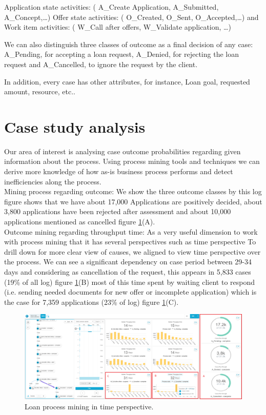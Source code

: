 Application state activities: ( A\_Create Application, A\_Submitted, A\_Concept,…)
Offer state activities: ( O\_Created, O\_Sent, O\_Accepted,…) and
Work item activities: ( W\_Call after offers, W\_Validate application, …)

We can also distinguish three classes of outcome as a final decision of any case:
A\_Pending, for accepting a loan request,
A\_Denied, for rejecting the loan request and
A\_Cancelled, to ignore the request by the client.

In addition, every case has other attributes, for instance, Loan goal, requested amount, resource, etc.. 


\section{Case study analysis}
Our area of interest is analysing case outcome probabilities regarding given information about the process. Using process mining tools and techniques we can derive more knowledge of how as-is business process performs and detect inefficiencies along the process. 
\\

Mining process regarding outcome: 
We show the three outcome classes by this log figure shows that we have about 17,000
Applications are positively decided, about 3,800 applications have been rejected after assessment and about 10,000 applications mentioned as cancelled figure \ref{fig:outcome}(A).
\\

Outcome mining regarding throughput time:
As a very useful dimension to work with process mining that it has several perspectives such as time perspective
To drill down for more clear view of causes, we aligned to view time perspective over the process. 
We can see a significant dependency on case period between 29-34 days and considering as cancellation of the request, this appears in 5,833 cases (19\% of all log) figure \ref{fig:outcome}(B) most of this time spent by waiting client to respond (i.e. sending needed documents for new offer or incomplete application) which is the case for 7,359 applications (23\% of log) figure \ref{fig:outcome}(C).
\\
\begin{figure}[h]
\centering
\includegraphics[width=\textwidth]{images/throughput_time.png}
\caption{\label{fig:outcome}Loan process mining in time perspective.}
\end{figure}

